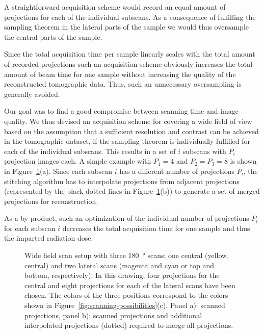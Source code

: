 A straightforward acquisition scheme would record an equal amount of projections for each of the individual subscans. As a consequence of fulfilling the sampling theorem in the lateral parts of the sample we would thus oversample the central parts of the sample. 

Since the total acquisition time per sample linearly scales with the total amount of recorded projections such an acquisition scheme obviously increases the total amount of beam time for one sample without increasing the quality of the reconstructed tomographic data. Thus, such an unnecessary oversampling is generally avoided.

Our goal was to find a good compromise between scanning time and image quality. We thus devised an acquisition scheme for covering a wide field of view based on the assumption that a sufficient resolution and contrast can be achieved in the tomographic dataset, if the sampling theorem is individually fulfilled for each of the individual subscans. This results in a set of $i$ subscans with $P_{i}$ projection images each. A simple example with $P_{1}=4$ and $P_{2}=P_{3}=8$ is shown in Figure~\ref{fig:projections}(a). Since each subscan $i$ has a different number of projections $P_{i}$, the stitching algorithm has to interpolate projections from adjacent projections (represented by the black dotted lines in Figure~\ref{fig:projections}(b)) to generate a set of merged projections for reconstruction.

As a by-product, such an optimization of the individual number of projections $P_{i}$ for each subscan $i$ decreases the total acquisition time for one sample and thus the imparted radiation dose.

\begin{figure}
	\centering
	\caption{Wide field scan setup with three \SI{180}{\degree} scans; one central (yellow, central) and two lateral scans (magenta and cyan or top and bottom, respectively). In this drawing, four projections for the central and eight projections for each of the lateral scans have been chosen. The colors of the three positions correspond to the colors shown in Figure~\ref{fig:scanning-possibilities}(c). Panel a): scanned projections, panel b): scanned projections and additional interpolated projections (dotted) required to merge all projections.}
	\ifiucr
		
	\else
	\fi
	\label{fig:projections}
\end{figure}

